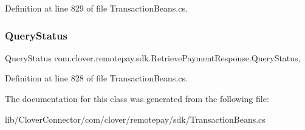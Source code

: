 Definition at line 829 of file Transaction\+Beans.\+cs.

\mbox{\label{classcom_1_1clover_1_1remotepay_1_1sdk_1_1_retrieve_payment_response_ad3ad4b7c6f84ce21594b187cfab54dc8}} 
\subsubsection{\texorpdfstring{Query\+Status}{QueryStatus}}
{\footnotesize\ttfamily Query\+Status com.\+clover.\+remotepay.\+sdk.\+Retrieve\+Payment\+Response.\+Query\+Status\hspace{0.3cm}{\ttfamily [get]}, {\ttfamily [set]}}



Definition at line 828 of file Transaction\+Beans.\+cs.



The documentation for this class was generated from the following file\+:\begin{DoxyCompactItemize}
\item 
lib/\+Clover\+Connector/com/clover/remotepay/sdk/Transaction\+Beans.\+cs\end{DoxyCompactItemize}
